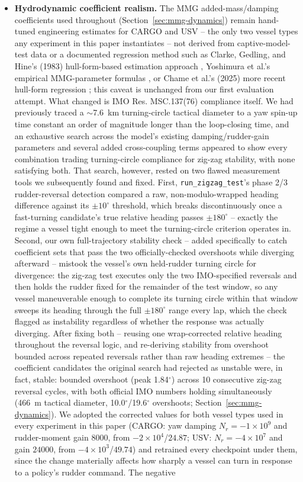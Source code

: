 \documentclass[journal,twocolumn,10pt]{IEEEtran}
\begin{document}
\begin{itemize}
    \item \textbf{Hydrodynamic coefficient realism.} The MMG added-mass/damping coefficients used throughout (Section~\ref{sec:mmg-dynamics}) remain hand-tuned engineering estimates for CARGO and USV -- the only two vessel types any experiment in this paper instantiates -- not derived from captive-model-test data or a documented regression method such as Clarke, Gedling, and Hine's (1983) hull-form-based estimation approach \cite{clarke1983manoeuvring}, Yoshimura et al.'s empirical MMG-parameter formulas \cite{wang2024mmg}, or Chame et al.'s (2025) more recent hull-form regression \cite{chame2025linearderivative}; this caveat is unchanged from our first evaluation attempt. What changed is IMO Res. MSC.137(76) compliance itself. We had previously traced a $\sim$7.6~km turning-circle tactical diameter to a yaw spin-up time constant an order of magnitude longer than the loop-closing time, and an exhaustive search across the model's existing damping/rudder-gain parameters and several added cross-coupling terms appeared to show every combination trading turning-circle compliance for zig-zag stability, with none satisfying both. That search, however, rested on two flawed measurement tools we subsequently found and fixed. First, \texttt{run\_zigzag\_test}'s phase 2/3 rudder-reversal detection compared a raw, non-modulo-wrapped heading difference against its $\pm 10^\circ$ threshold, which breaks discontinuously once a fast-turning candidate's true relative heading passes $\pm 180^\circ$ -- exactly the regime a vessel tight enough to meet the turning-circle criterion operates in. Second, our own full-trajectory stability check -- added specifically to catch coefficient sets that pass the two officially-checked overshoots while diverging afterward -- mistook the vessel's own held-rudder turning circle for divergence: the zig-zag test executes only the two IMO-specified reversals and then holds the rudder fixed for the remainder of the test window, so any vessel maneuverable enough to complete its turning circle within that window sweeps its heading through the full $\pm 180^\circ$ range every lap, which the check flagged as instability regardless of whether the response was actually diverging. After fixing both -- reusing one wrap-corrected relative heading throughout the reversal logic, and re-deriving stability from overshoot bounded across repeated reversals rather than raw heading extremes -- the coefficient candidates the original search had rejected as unstable were, in fact, stable: bounded overshoot (peak 1.84$^\circ$) across 10 consecutive zig-zag reversal cycles, with both official IMO numbers holding simultaneously (466~m tactical diameter, 10.0$^\circ$/19.6$^\circ$ overshoots; Section~\ref{sec:mmg-dynamics}). We adopted the corrected values for both vessel types used in every experiment in this paper (CARGO: yaw damping $N_r=-1\times10^9$ and rudder-moment gain $8000$, from $-2\times10^4$/$24.87$; USV: $N_r=-4\times10^7$ and gain $24000$, from $-4\times10^3$/$49.74$) and retrained every checkpoint under them, since the change materially affects how sharply a vessel can turn in response to a policy's rudder command. The negative 
\end{itemize}
\end{document}

